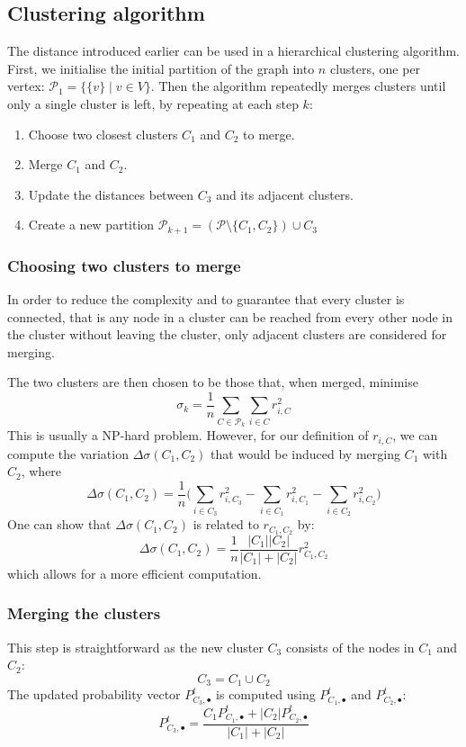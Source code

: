 \documentclass[12pt]{article}
\theoremstyle{definition}
\begin{document}
\subsection{Clustering algorithm}
The distance introduced earlier can be used in a hierarchical clustering algorithm. First, we initialise the initial partition of the graph into $n$ clusters, one per vertex: $\mathcal{P}_1 = \{\{v\} \mid v \in V\}$. Then the algorithm repeatedly merges clusters until only a single cluster is left, by repeating at each step $k$:
\begin{enumerate}
	\item Choose two closest clusters $C_1$ and $C_2$ to merge.
	\item Merge $C_1$ and $C_2$.
	\item Update the distances between $C_3$ and its adjacent clusters.
	\item Create a new partition $\mathcal{P}_{k+1} = (\mathcal{P} \setminus \{C_1, C_2\}) \cup C_3$
\end{enumerate}
\subsubsection{Choosing two clusters to merge}
In order to reduce the complexity and to guarantee that every cluster is connected, that is any node in a cluster can be reached from every other node in the cluster without leaving the cluster, only adjacent clusters are considered for merging.

The two clusters are then chosen to be those that, when merged, minimise 
\[\sigma_k = \frac{1}{n} \sum_{C \in \mathcal{P}_k} \sum_{i \in C} r_{i,C}^2\]
This is usually a NP-hard problem. However, for our definition of $r_{i,C}$, we can compute the variation $\Delta\sigma(C_1,C_2)$ that would be induced by merging $C_1$ with $C_2$, where
\[\Delta\sigma(C_1,C_2) = \frac{1}{n} \big( \sum_{i \in C_3} r_{i,C_3}^2 - \sum_{i \in C_1} r_{i,C_1}^2 - \sum_{i \in C_2} r_{i,C_2}^2 \big)\]
One can show that $\Delta\sigma(C_1,C_2)$ is related to $r_{C_1, C_2}$ by:
\begin{equation}
	\label{eq_theorem3}
	\Delta\sigma(C_1,C_2) = \frac{1}{n}\frac{|C_1||C_2|}{|C_1| + |C_2|} r_{C_1,C_2}^2 
\end{equation}
which allows for a more efficient computation.
\subsubsection{Merging the clusters}
This step is straightforward as the new cluster $C_3$ consists of the nodes in $C_1$ and $C_2$:
\[ C_3 = C_1 \cup C_2 \]
The updated probability vector $P_{C_3,\bullet}^t$ is computed using $P_{C_1,\bullet}^t$ and $P_{C_2,\bullet}^t$:
\[P_{C_3,\bullet}^t = \frac{C_1 P_{C_1,\bullet}^t + |C_2| P_{C_2,\bullet}^t}{|C_1| + |C_2|}\]
\end{document}
